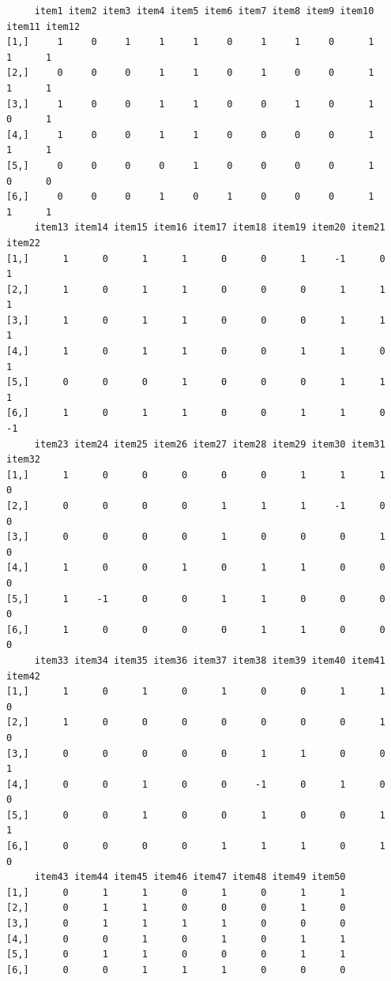 \documentclass[
  a4paper,
]{ltjsbook}
\begin{document}
\begin{verbatim}
     item1 item2 item3 item4 item5 item6 item7 item8 item9 item10 item11 item12
[1,]     1     0     1     1     1     0     1     1     0      1      1      1
[2,]     0     0     0     1     1     0     1     0     0      1      1      1
[3,]     1     0     0     1     1     0     0     1     0      1      0      1
[4,]     1     0     0     1     1     0     0     0     0      1      1      1
[5,]     0     0     0     0     1     0     0     0     0      1      0      0
[6,]     0     0     0     1     0     1     0     0     0      1      1      1
     item13 item14 item15 item16 item17 item18 item19 item20 item21 item22
[1,]      1      0      1      1      0      0      1     -1      0      1
[2,]      1      0      1      1      0      0      0      1      1      1
[3,]      1      0      1      1      0      0      0      1      1      1
[4,]      1      0      1      1      0      0      1      1      0      1
[5,]      0      0      0      1      0      0      0      1      1      1
[6,]      1      0      1      1      0      0      1      1      0     -1
     item23 item24 item25 item26 item27 item28 item29 item30 item31 item32
[1,]      1      0      0      0      0      0      1      1      1      0
[2,]      0      0      0      0      1      1      1     -1      0      0
[3,]      0      0      0      0      1      0      0      0      1      0
[4,]      1      0      0      1      0      1      1      0      0      0
[5,]      1     -1      0      0      1      1      0      0      0      0
[6,]      1      0      0      0      0      1      1      0      0      0
     item33 item34 item35 item36 item37 item38 item39 item40 item41 item42
[1,]      1      0      1      0      1      0      0      1      1      0
[2,]      1      0      0      0      0      0      0      0      1      0
[3,]      0      0      0      0      0      1      1      0      0      1
[4,]      0      0      1      0      0     -1      0      1      0      0
[5,]      0      0      1      0      0      1      0      0      1      1
[6,]      0      0      0      0      1      1      1      0      1      0
     item43 item44 item45 item46 item47 item48 item49 item50
[1,]      0      1      1      0      1      0      1      1
[2,]      0      1      1      0      0      0      1      0
[3,]      0      1      1      1      1      0      0      0
[4,]      0      0      1      0      1      0      1      1
[5,]      0      1      1      0      0      0      1      1
[6,]      0      0      1      1      1      0      0      0
\end{verbatim}
\end{document}
